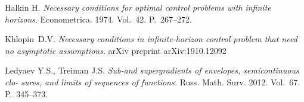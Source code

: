 	\begin{thebibliography}{99}
Halkin H. {\it   Necessary conditions for optimal control problems with infinite horizons}. Econometrica. 1974. Vol.~42. P.~267--272.

Khlopin~D.V. {\it Necessary conditions in infinite-horizon control problem
	that need no asymptotic assumptions}. arXiv preprint arXiv:1910.12092

 Ledyaev Y.S., Treiman J.S. {\it Sub-and supergradients of envelopes, semicontinuous clo-
sures, and limits of sequences of functions.} Russ. Math. Surv. 2012. Vol.~67. P.~345--373.
	\end{thebibliography}
	
	
	
	
	
	
%
